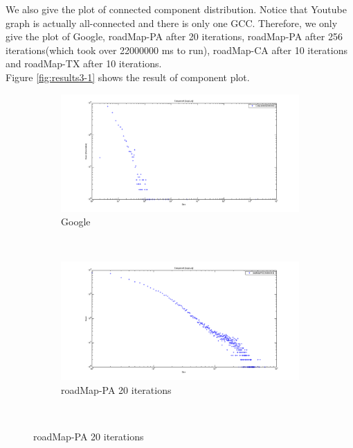 We also give the plot of connected component distribution. Notice that Youtube graph is actually all-connected and there is only one GCC. Therefore, we only give the plot of Google, roadMap-PA after 20 iterations, roadMap-PA after 256 iterations(which took over 22000000 ms to run), roadMap-CA after 10 iterations and roadMap-TX after 10 iterations.\\
Figure \ref{fig:results3-1} shows the result of component plot.
\begin{figure}
    \centering
    \begin{subfigure}[htbp]{0.8\textwidth}
            \includegraphics[width=\textwidth]{FIG/cp-google.png}
            \caption{Google}
            \label{fig:cp-google}
    \end{subfigure}
    ~ %
    \begin{subfigure}[htbp]{0.8\textwidth}
            \includegraphics[width=\textwidth]{FIG/cp-pa-20.png}
            \caption{roadMap-PA 20 iterations}
            \label{fig:cp-pa-20}
    \end{subfigure}
    ~ %

\end{figure}
